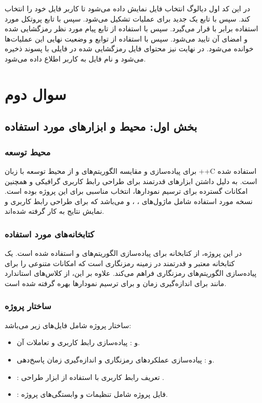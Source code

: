 \documentclass{report}
\begin{document}
در این کد اول دیالوگ انتخاب فایل نمایش داده می‌شود تا کاربر فایل خود را انتخاب کند. سپس با تابع  یک  جدید برای عملیات تشکیل می‌شود. سپس با تابع  پروتکل مورد استفاده برابر با  قرار می‌گیرد. سپس با استفاده از تابع  پیام مورد نظر رمزگشایی شده و امضای آن تایید می‌شود. سپس با استفاده از توابع  و  وضعیت نهایی این عملیات‌ها خوانده می‌شود. در نهایت نیز محتوای فایل رمزگشایی شده در فایلی با پسوند  ذخیره می‌شود و نام فایل به کاربر اطلاع داده می‌شود.

\section{سوال دوم}

\subsection*{بخش اول: محیط و ابزارهای مورد استفاده}

\subsubsection*{محیط توسعه}
برای پیاده‌سازی و مقایسه الگوریتم‌های  و  از محیط توسعه  با زبان ++C استفاده شده است.  به دلیل داشتن ابزارهای قدرتمند برای طراحی رابط کاربری گرافیکی و همچنین امکانات گسترده برای ترسیم نمودارها، انتخاب مناسبی برای این پروژه بوده است. نسخه مورد استفاده شامل ماژول‌های ، ،  و  می‌باشد که برای طراحی رابط کاربری و نمایش نتایج به کار گرفته شده‌اند.

\subsubsection*{کتابخانه‌های مورد استفاده}
در این پروژه، از کتابخانه  برای پیاده‌سازی الگوریتم‌های  و  استفاده شده است.  یک کتابخانه معتبر و قدرتمند در زمینه رمزنگاری است که امکانات متنوعی را برای پیاده‌سازی الگوریتم‌های رمزنگاری فراهم می‌کند. علاوه بر این، از کلاس‌های استاندارد  مانند  برای اندازه‌گیری زمان و  برای ترسیم نمودارها بهره گرفته شده است.

\subsubsection*{ساختار پروژه}
ساختار پروژه شامل فایل‌های زیر می‌باشد:
\begin{itemize}
    \item \textbf{} و \textbf{}: پیاده‌سازی رابط کاربری و تعاملات آن.
    \item \textbf{} و \textbf{}: پیاده‌سازی عملکردهای رمزنگاری و اندازه‌گیری زمان پاسخ‌دهی.
    \item \textbf{}: تعریف رابط کاربری با استفاده از ابزار طراحی .
    \item \textbf{}: فایل پروژه  شامل تنظیمات و وابستگی‌های پروژه.
\end{itemize}
\end{document}
